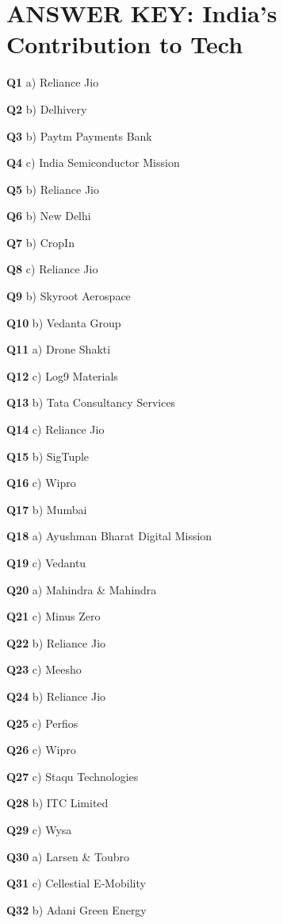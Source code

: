 \section{ANSWER KEY: India's Contribution to Tech}

\textbf{Q1} a) Reliance Jio\par
\textbf{Q2} b) Delhivery\par
\textbf{Q3} b) Paytm Payments Bank\par
\textbf{Q4} c) India Semiconductor Mission\par
\textbf{Q5} b) Reliance Jio\par
\textbf{Q6} b) New Delhi\par
\textbf{Q7} b) CropIn\par
\textbf{Q8} c) Reliance Jio\par
\textbf{Q9} b) Skyroot Aerospace\par
\textbf{Q10} b) Vedanta Group\par
\textbf{Q11} a) Drone Shakti\par
\textbf{Q12} c) Log9 Materials\par
\textbf{Q13} b) Tata Consultancy Services\par
\textbf{Q14} c) Reliance Jio\par
\textbf{Q15} b) SigTuple\par
\textbf{Q16} c) Wipro\par
\textbf{Q17} b) Mumbai\par
\textbf{Q18} a) Ayushman Bharat Digital Mission\par
\textbf{Q19} c) Vedantu\par
\textbf{Q20} a) Mahindra & Mahindra\par
\textbf{Q21} c) Minus Zero\par
\textbf{Q22} b) Reliance Jio\par
\textbf{Q23} c) Meesho\par
\textbf{Q24} b) Reliance Jio\par
\textbf{Q25} c) Perfios\par
\textbf{Q26} c) Wipro\par
\textbf{Q27} c) Staqu Technologies\par
\textbf{Q28} b) ITC Limited\par
\textbf{Q29} c) Wysa\par
\textbf{Q30} a) Larsen & Toubro\par
\textbf{Q31} c) Cellestial E‑Mobility\par
\textbf{Q32} b) Adani Green Energy\par
